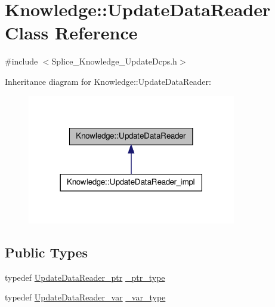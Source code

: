 \hypertarget{classKnowledge_1_1UpdateDataReader}{
\section{Knowledge::UpdateDataReader Class Reference}
\label{d7/d6e/classKnowledge_1_1UpdateDataReader}
}


{\ttfamily \#include $<$Splice\_\-Knowledge\_\-UpdateDcps.h$>$}



Inheritance diagram for Knowledge::UpdateDataReader:
\nopagebreak
\begin{figure}[H]
\begin{center}
\leavevmode
\includegraphics[width=258pt]{d2/d7f/classKnowledge_1_1UpdateDataReader__inherit__graph}
\end{center}
\end{figure}
\subsection*{Public Types}
\begin{DoxyCompactItemize}
\item 
typedef \hyperlink{classKnowledge_1_1UpdateDataReader}{UpdateDataReader\_\-ptr} \hyperlink{classKnowledge_1_1UpdateDataReader_a5aa1e0d7df2df2db07892433815c0864}{\_\-ptr\_\-type}
\item 
typedef \hyperlink{namespaceKnowledge_acbf12106aaac4bdb65b120d8c2f38757}{UpdateDataReader\_\-var} \hyperlink{classKnowledge_1_1UpdateDataReader_a4300e2956b49cd500ba1024e4d7c54a7}{\_\-var\_\-type}
\end{DoxyCompactItemize}
